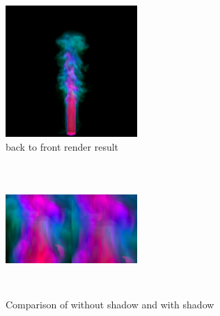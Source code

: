 \documentclass[acmtog]{acmart}
\begin{document}
\begin{figure}[h]
	\centering
	\includegraphics[width=5cm,height=5cm]{backward_pre_noshadow.png}
	\caption{back to front render result}
\end{figure}

\begin{figure}[h]
	\centering
	\includegraphics[width=5cm,height=5cm]{comparison.jpg}
	\caption{Comparison of without shadow and with shadow}
\end{figure}
\end{document}
